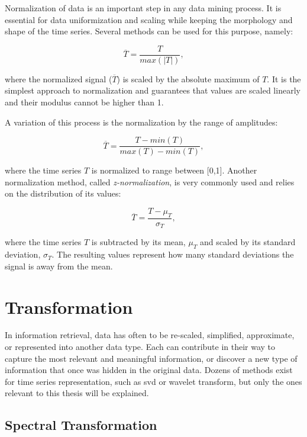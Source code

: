 Normalization of data is an important step in any data mining process. It is essential for data uniformization and scaling while keeping the morphology and shape of the time series. Several methods can be used for this purpose, namely:

\begin{equation}
\overline{T} = \frac{T}{max(|T|)},
\end{equation}

where the normalized signal ($\overline{T}$) is scaled by the absolute maximum of $T$. It is the simplest approach to normalization and guarantees that values are scaled linearly and their modulus cannot be higher than 1.
\par
A variation of this process is the normalization by the range of amplitudes:

\begin{equation}
\overline{T} = \frac{T-min(T)}{max(T)-min(T)},
\end{equation}

where the time series $T$ is normalized to range between [0,1].
Another normalization method, called \textit{z-normalization}, is very commonly used and relies on the distribution of its values:

\begin{equation}
\overline{T} = \frac{T-\mu_T}{\sigma_T},
\end{equation}

where the time series $T$ is subtracted by its mean, $\mu_T$ and scaled by its standard deviation, $\sigma_T$. The resulting values represent how many standard deviations the signal is away from the mean.


\section{Transformation} 
\label{sec:transform}

In information retrieval, data has often to be re-scaled, simplified, approximate, or represented into another data type. Each can contribute in their way to capture the most relevant and meaningful information, or discover a new type of information that once was hidden in the original data. Dozens of methods exist for time series representation, such as \gls{svd} or wavelet transform, but only the ones relevant to this thesis will be explained.

\subsection{Spectral Transformation}
\label{subsec:spec_transform}

